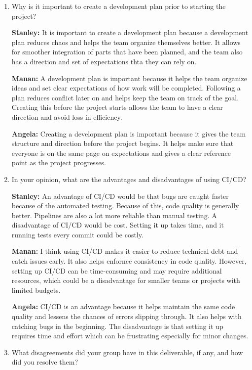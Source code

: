 \documentclass{article}
\begin{document}


\begin{enumerate}
    \item Why is it important to create a development plan prior to starting the
    project?

\textbf{Stanley:} It is important to create a development plan because a development plan reduces chaos and helps the team organize themselves better. It allows for smoother integration of parts that have been planned, and the team also has a direction and set of expectations thta they can rely on. 

\textbf{Manan:} A development plan is important because it helps the team organize ideas and set clear expectations of how work will be completed. Following a plan reduces conflict later on and helps keep the team on track of the goal. Creating this before the project starts allows the team to have a clear direction and avoid loss in efficiency.

\textbf{Angela:} Creating a development plan is important because it gives the team structure and direction before the project begins. It helps make sure that everyone is on the same page on expectations and gives a clear reference point as the project progresses.

    \item In your opinion, what are the advantages and disadvantages of using
    CI/CD?

\textbf{Stanley:} An advantage of CI/CD would be that bugs are caught faster because of the automated testing. Because of this, code quality is generally better. Pipelines are also a lot more reliable than manual testing. A disadvantage of CI/CD would be cost. Setting it up takes time, and it running tests every commit could be costly.

\textbf{Manan:} I think using CI/CD makes it easier to reduce technical debt and catch issues early. It also helps enfornce consistency in code quality. However, setting up CI/CD can be time-consuming and may require additional resources, which could be a disadvantage for smaller teams or projects with limited budgets.

\textbf{Angela:} CI/CD is an advantage because it helps maintain the same code quality and lessens the chances of errors slipping through. It also helps with catching bugs in the beginning. The disadvantage is that setting it up requires time and effort which can be frustrating especially for minor changes.

    \item What disagreements did your group have in this deliverable, if any,
    and how did you resolve them?


\end{enumerate}
\end{document}
